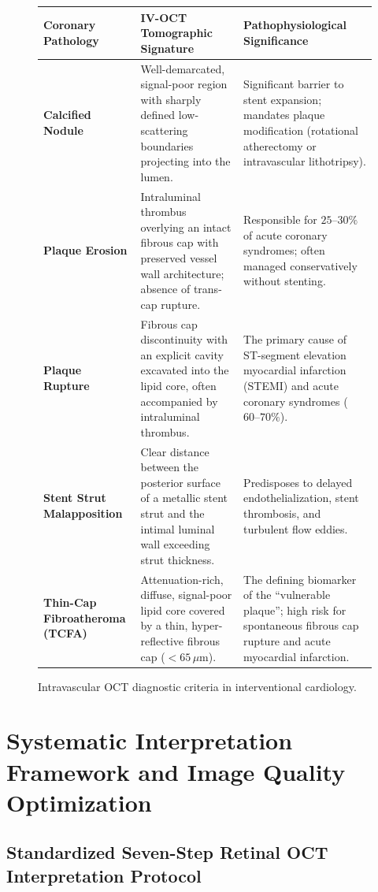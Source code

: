 \documentclass[11pt,a4paper]{article}
\begin{document}
\begin{figure}[htbp]
\centering
\setlength{\tabcolsep}{4pt}
\begin{tabular}{p{3.8cm}p{5.4cm}p{5.4cm}}
\toprule
\textbf{Coronary Pathology} & \textbf{IV-OCT Tomographic Signature} & \textbf{Pathophysiological Significance} \\
\midrule
\textbf{Calcified Nodule} & Well-demarcated, signal-poor region with sharply defined low-scattering boundaries projecting into the lumen. & Significant barrier to stent expansion; mandates plaque modification (rotational atherectomy or intravascular lithotripsy). \\
\addlinespace
\textbf{Plaque Erosion} & Intraluminal thrombus overlying an intact fibrous cap with preserved vessel wall architecture; absence of trans-cap rupture. & Responsible for $25\text{--}30\%$ of acute coronary syndromes; often managed conservatively without stenting. \\
\addlinespace
\textbf{Plaque Rupture} & Fibrous cap discontinuity with an explicit cavity excavated into the lipid core, often accompanied by intraluminal thrombus. & The primary cause of ST-segment elevation myocardial infarction (STEMI) and acute coronary syndromes ($60\text{--}70\%$). \\
\addlinespace
\textbf{Stent Strut Malapposition} & Clear distance between the posterior surface of a metallic stent strut and the intimal luminal wall exceeding strut thickness. & Predisposes to delayed endothelialization, stent thrombosis, and turbulent flow eddies. \\
\addlinespace
\textbf{Thin-Cap Fibroatheroma (TCFA)} & Attenuation-rich, diffuse, signal-poor lipid core covered by a thin, hyper-reflective fibrous cap ($< 65\,\mu\text{m}$). & The defining biomarker of the ``vulnerable plaque''; high risk for spontaneous fibrous cap rupture and acute myocardial infarction. \\
\bottomrule
\end{tabular}
\caption{Intravascular OCT diagnostic criteria in interventional cardiology.}
\label{tab:ivoct_pathology}
\end{figure}

\section{Systematic Interpretation Framework and Image Quality Optimization}

\subsection{Standardized Seven-Step Retinal OCT Interpretation Protocol}
\end{document}
